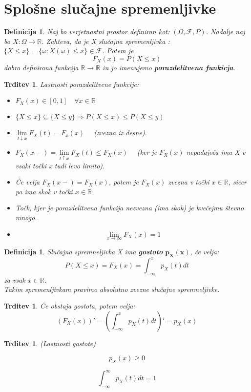 \documentclass[11pt]{article}
\newtheorem{Trditev}[Izrek]{{\sc Trditev}}
\newtheorem{Definicija}[Izrek]{{\sc Definicija}}
\begin{document}
\section{Splošne slučajne spremenljivke}
\begin{Definicija}
	Naj bo verjetnostni prostor definiran kot: $(\Omega, \mathcal{F},P)$. Nadalje naj bo $X: \Omega \to \mathbb{R}$. Zahteva, da je X slučajna spremenljivka : $\{ X\le x\} = \{\omega ; X(\omega) \le x\} \in \mathcal{F}$. Potem je $$F_X(x)  = P(X \le x)$$ dobro definirana funkcija $\mathbb{R}\to \mathbb{R}$ in jo imenujemo \textbf{porazdelitvena funkicja}.
\end{Definicija}
\begin{Trditev}
	Lastnosti porazdelitvene funkcije:
	\begin{itemize}
		\item
		$F_X(x) \in [0,1] \quad \forall x\in \mathbb{R}$
		\item
		$\{X \le x\} \subseteq \{X \le y \} \Rightarrow P(X \le x) \le P(X \le y) $
		\item
		$\lim\limits_{t \downarrow x}{F_X(t)} = F_x(x) \quad$ (zvezna iz desne).
		\item
		$F_X(x-) = \lim\limits_{t\uparrow x}F_X(t) \le F_X(x) \quad$
		(ker je $F_X(x)$ nepadajoča ima X v vsaki točki x tudi levo limito).
		
		\item
		Če velja $F_X(x -) = F_X(x)$, potem je $F_X(x)$ zvezna v točki $x\in\mathbb{R}$, sicer pa ima skok v točki $x\in \mathbb{R}$.
		\item
		Točk, kjer je porazdelitvena funkcija nezvezna (ima skok) je kvečejmu števno mnogo.
		\item
		$$\lim\limits_{x \to \infty}{F_X(x)} = 1$$  
	\end{itemize}
\end{Trditev}
\begin{Definicija}
	Slučajna spremneljivka X ima\textbf{ gostoto} $\mathbf{p_X(x)}$, če velja:
	$$P(X\le x) = F_X(x) = \int_{-\infty}^{x}{p_X(t)dt}$$ za vsak $x\in \mathbb{R}$.
	\\
	Takim spremenljivkam pravimo absolutno zvezne slučajne spremneljivke. 
\end{Definicija}
\begin{Trditev}
	Če obstaja gostota, potem velja:
	$$\left( F_X(x) \right)' = \left(\int_{-\infty}^{x}{p_X(t)dt}\right)'= p_X(x)$$
\end{Trditev}
\begin{Trditev}(Lastnosti gostote)

		$$p_X(x) \ge 0$$
		
		$$\int_{-\infty}^{\infty}{p_X(t) dt} = 1 $$
\end{Trditev}
\end{document}
